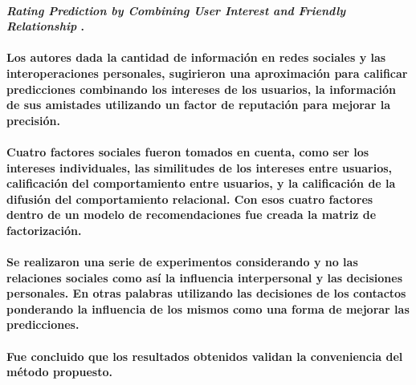 
\paragraph{
    \textbf{\emph{Rating Prediction by Combining User Interest
            and Friendly Relationship}
    }
    \cite[pág. 167]{somani_emerging_2019}.
}

\paragraph{
    Los autores dada la cantidad de información en redes sociales y las interoperaciones personales, sugirieron una aproximación para calificar predicciones combinando los intereses de los usuarios, la información de sus amistades
    utilizando un factor de reputación para mejorar la precisión.
}

\paragraph{
    Cuatro factores sociales fueron tomados en cuenta, como ser los intereses individuales,
    las similitudes de los intereses entre usuarios, calificación del comportamiento entre usuarios,
    y la calificación de la difusión del comportamiento relacional. Con esos cuatro factores dentro
    de un modelo de recomendaciones fue creada la matriz de factorización.
}

\paragraph{
    Se realizaron una serie de experimentos considerando y no las relaciones sociales
    como así la influencia interpersonal y las decisiones personales.
    En otras palabras utilizando las decisiones de los contactos ponderando
    la influencia de los mismos como una forma de mejorar las predicciones.
}

\paragraph{
    Fue concluido que los resultados obtenidos validan la conveniencia del método propuesto.
}
